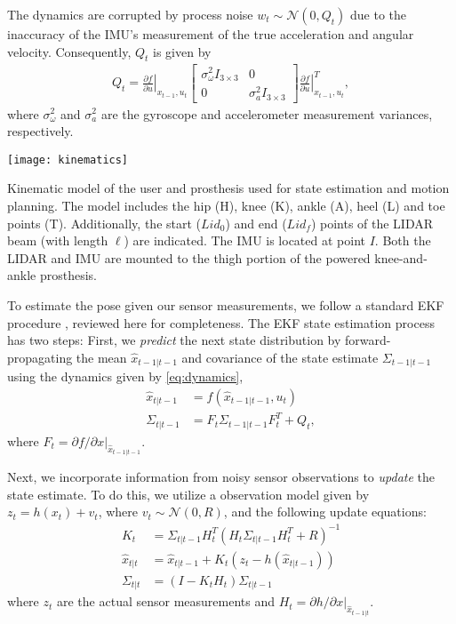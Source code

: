 The dynamics are corrupted by process noise $w_t \sim \mathcal{N}(0, Q_t)$ due
to the inaccuracy of the IMU's measurement of the true acceleration and angular
velocity. Consequently, $Q_t$ is given by
\begin{align}
    Q_t = \left. \frac{\partial f}{\partial u} \right|_{x_{t-1}, u_t}
        \begin{bmatrix} \sigma_\omega^2 I_{3\times3} & 0 \\ 
            0 & \sigma_a^2 I_{3\times3} \end{bmatrix}
        \left. \frac{\partial f}{\partial u} \right|_{x_{t-1}, u_t}^T,
\end{align}
where $\sigma_\omega^2$ and $\sigma_a^2$ are the gyroscope and accelerometer
measurement variances, respectively.

\begin{marginfigure}
    \centering
    \texttt{[image: kinematics]}
    \caption{Kinematic model of the user and prosthesis used for state
    estimation and motion planning. The model includes the hip (H), knee (K),
    ankle (A), heel (L) and toe points (T). Additionally, the start ($Lid_0$)
    and end ($Lid_f$) points of the LIDAR beam (with length $\ell$) are
    indicated. The IMU is located at point $I$. Both the LIDAR and IMU are
    mounted to the thigh portion of the powered knee-and-ankle
    prosthesis.}\label{fig:kinematics}
\end{marginfigure}

To estimate the pose given our sensor measurements, we follow a standard EKF
procedure \citep{anderson1979optimal}, reviewed here for completeness. The EKF
state estimation process has two steps: First, we \emph{predict} the next state
distribution by forward-propagating the mean $\hat{x}_{t-1|t-1}$ and covariance
of the state estimate $\Sigma_{t-1|t-1}$ using the dynamics given by
\cref{eq:dynamics},
\begin{align}
    \hat{x}_{t|t-1} &= f(\hat{x}_{t-1|t-1}, u_t) \\
    \Sigma_{t|t-1} &= F_t \Sigma_{t-1|t-1} F_t^T + Q_t,
\end{align}
where $F_t = \left. \partial f / \partial x \right|_{\hat{x}_{t-1|t-1}}$.

Next, we incorporate information from noisy sensor observations to \emph{update}
the state estimate. To do this, we utilize a observation model given by $z_t =
h(x_t) + v_t$, where $v_t \sim \mathcal{N}\left(0, R \right)$, and the following
update equations:
\begin{align}
    K_t &= \Sigma_{t|t-1} H_t^T 
        {\left(H_t \Sigma_{t|t-1} H_t^T + R\right)}^{-1} \\
    \hat{x}_{t|t} &= \hat{x}_{t|t-1} + K_t \left(z_t - h(\hat{x}_{t|t-1}) \right) \\
    \Sigma_{t|t} &= \left(I - K_t H_t \right) \Sigma_{t|t-1}
\end{align}
where $z_t$ are the actual sensor measurements and $H_t = \left. \partial h /
\partial x \right|_{\hat{x}_{t-1|t}}$.

